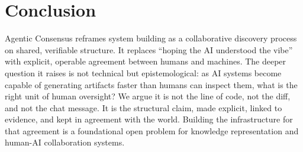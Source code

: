 
\section{Conclusion}
Agentic Consensus reframes system building as a collaborative discovery process on shared, verifiable structure.
It replaces ``hoping the AI understood the vibe'' with explicit, operable agreement between humans and machines.
The deeper question it raises is not technical but epistemological: as AI systems become capable of generating artifacts faster than humans can inspect them, what is the right unit of human oversight?
We argue it is not the line of code, not the diff, and not the chat message. It is the structural claim, made explicit, linked to evidence, and kept in agreement with the world.
Building the infrastructure for that agreement is a foundational open problem for knowledge representation and human-AI collaboration systems.
